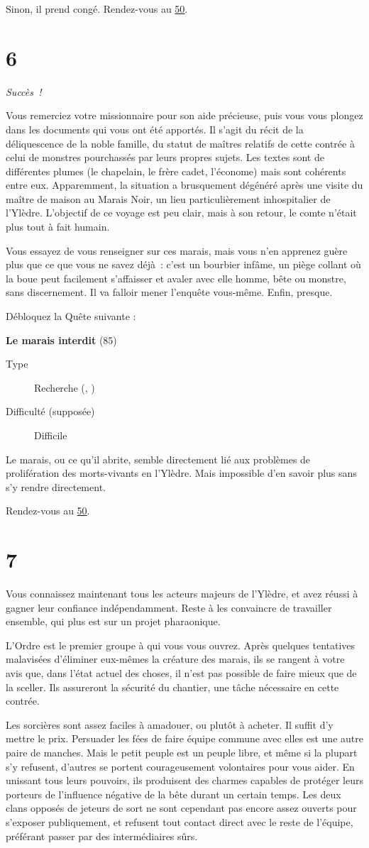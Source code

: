 \documentclass{report}
\newcommand{\gsection}[1]{
    \section{#1}
    \label{section-#1}
}
\newcommand{\glink}[1]{\hyperref[section-#1]{#1}}
\newcommand{\quest}[5]{
    \begin{mdframed}[innertopmargin=0.5cm,innerbottommargin=0.5cm,leftmargin=0.5cm,rightmargin=0.5cm]
        \begin{center}
            \textbf{#1} (#2)
        \end{center}
        \begin{description}
            \item[Type] #3
            \item[Difficulté (supposée)] #4
        \end{description}
        #5
    \end{mdframed}
}
\newcommand{\success}{\emph{Succès !}}
\begin{document}
Sinon, il prend congé. Rendez-vous au \glink{50}.

\gsection{6}

\success

Vous remerciez votre missionnaire pour son aide précieuse, puis vous vous plongez dans les documents qui vous ont été apportés. Il s'agit du récit de la déliquescence de la noble famille, du statut de maîtres relatifs de cette contrée à celui de monstres pourchassés par leurs propres sujets. Les textes sont de différentes plumes (le chapelain, le frère cadet, l'économe) mais sont cohérents entre eux. Apparemment, la situation a brusquement dégénéré après une visite du maître de maison au Marais Noir, un lieu particulièrement inhospitalier de l'Ylèdre. L'objectif de ce voyage est peu clair, mais à son retour, le comte n'était plus tout à fait humain.

Vous essayez de vous renseigner sur ces marais, mais vous n'en apprenez guère plus que ce que vous ne savez déjà : c'est un bourbier infâme, un piège collant où la boue peut facilement s'affaisser et avaler avec elle homme, bête ou monstre, sans discernement. Il va falloir mener l'enquête vous-même. Enfin, presque.

Débloquez la Quête suivante :

\quest{Le marais interdit}{85}{Recherche (\ankh, \caduceus)}{Difficile}{
Le marais, ou ce qu'il abrite, semble directement lié aux problèmes de prolifération des morts-vivants en l'Ylèdre. Mais impossible d'en savoir plus sans s'y rendre directement.
}

Rendez-vous au \glink{50}.

\gsection{7}

Vous connaissez maintenant tous les acteurs majeurs de l'Ylèdre, et avez réussi à gagner leur confiance indépendamment. Reste à les convaincre de travailler ensemble, qui plus est sur un projet pharaonique.

L'Ordre est le premier groupe à qui vous vous ouvrez. Après quelques tentatives malavisées d'éliminer eux-mêmes la créature des marais, ils se rangent à votre avis que, dans l'état actuel des choses, il n'est pas possible de faire mieux que de la sceller. Ils assureront la sécurité du chantier, une tâche nécessaire en cette contrée.

Les sorcières sont assez faciles à amadouer, ou plutôt à acheter. Il suffit d'y mettre le prix. Persuader les fées de faire équipe commune avec elles est une autre paire de manches. Mais le petit peuple est un peuple libre, et même si la plupart s'y refusent, d'autres se portent courageusement volontaires pour vous aider. En unissant tous leurs pouvoirs, ils produisent des charmes capables de protéger leurs porteurs de l'influence négative de la bête durant un certain temps. Les deux clans opposés de jeteurs de sort ne sont cependant pas encore assez ouverts pour s'exposer publiquement, et refusent tout contact direct avec le reste de l'équipe, préférant passer par des intermédiaires sûrs.
\end{document}
